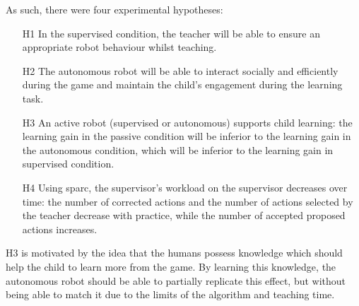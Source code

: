 
As such, there were four experimental hypotheses:
\begin{itemize}
	\item [H1] In the supervised condition, the teacher will be able to ensure an appropriate robot behaviour whilst teaching.
	\item [H2] The autonomous robot will be able to interact socially and efficiently during the game and maintain the child's engagement during the learning task.
	\item [H3] An active robot (supervised or autonomous) supports child learning: the learning gain in the passive condition will be inferior to the learning gain in the autonomous condition, which will be inferior to the learning gain in supervised condition.
	\item [H4] Using \gls{sparc}, the supervisor's workload on the supervisor decreases over time: the number of corrected actions and the number of actions selected  by the teacher decrease with practice, while the number of accepted proposed actions increases.
\end{itemize}

H3 is motivated by the idea that the humans possess knowledge which should help the child to learn more from the game. By learning this knowledge, the autonomous robot should be able to partially replicate this effect, but without being able to match it due to the limits of the algorithm and teaching time.


